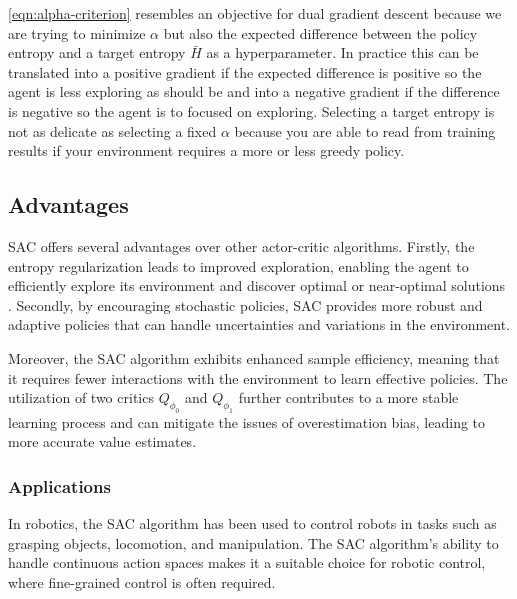 \eqref{eqn:alpha-criterion} resembles an objective for dual gradient descent because we are trying to minimize $\alpha$ but also the expected difference between the policy entropy and a target entropy $\bar{H}$ as a hyperparameter. In practice this can be translated into a positive gradient if the expected difference is positive so the agent is less exploring as should be and into a negative gradient if the difference is negative so the agent is to focused on exploring. Selecting a target entropy is not as delicate as selecting a fixed $\alpha$ because you are able to read from training results if your environment requires a more or less greedy policy. 



\subsection{Advantages}

SAC offers several advantages over other actor-critic algorithms. Firstly, the entropy regularization leads to improved exploration, enabling the agent to efficiently explore its environment and discover optimal or near-optimal solutions . Secondly, by encouraging stochastic policies, SAC provides more robust and adaptive policies that can handle uncertainties and variations in the environment.

Moreover, the SAC algorithm exhibits enhanced sample efficiency, meaning that it requires fewer interactions with the environment to learn effective policies. The utilization of two critics $Q_{\phi_0}$ and $Q_{\phi_1}$ further contributes to a more stable learning process and can mitigate the issues of overestimation bias, leading to more accurate value estimates. 

\subsubsection{Applications}


In robotics, the SAC algorithm has been used to control robots in tasks such as grasping objects, locomotion, and manipulation. The SAC algorithm's ability to handle continuous action spaces makes it a suitable choice for robotic control, where fine-grained control is often required. 

